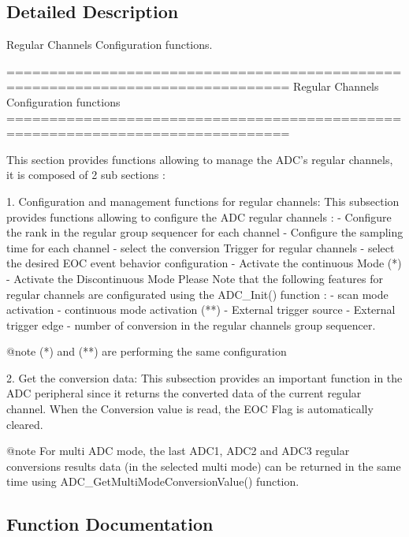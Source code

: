 \subsection{Detailed Description}
Regular Channels Configuration functions. 

\begin{DoxyVerb} ===============================================================================
                  Regular Channels Configuration functions
 ===============================================================================  

  This section provides functions allowing to manage the ADC's regular channels,
  it is composed of 2 sub sections : 
  
  1. Configuration and management functions for regular channels: This subsection 
     provides functions allowing to configure the ADC regular channels :    
          - Configure the rank in the regular group sequencer for each channel
          - Configure the sampling time for each channel
          - select the conversion Trigger for regular channels
          - select the desired EOC event behavior configuration
          - Activate the continuous Mode  (*)
          - Activate the Discontinuous Mode 
     Please Note that the following features for regular channels are configurated
     using the ADC_Init() function : 
          - scan mode activation 
          - continuous mode activation (**) 
          - External trigger source  
          - External trigger edge 
          - number of conversion in the regular channels group sequencer.
     
     @note (*) and (**) are performing the same configuration
     
  2. Get the conversion data: This subsection provides an important function in 
     the ADC peripheral since it returns the converted data of the current 
     regular channel. When the Conversion value is read, the EOC Flag is 
     automatically cleared.
     
     @note For multi ADC mode, the last ADC1, ADC2 and ADC3 regular conversions 
           results data (in the selected multi mode) can be returned in the same 
           time using ADC_GetMultiModeConversionValue() function. \end{DoxyVerb}
 

\subsection{Function Documentation}
